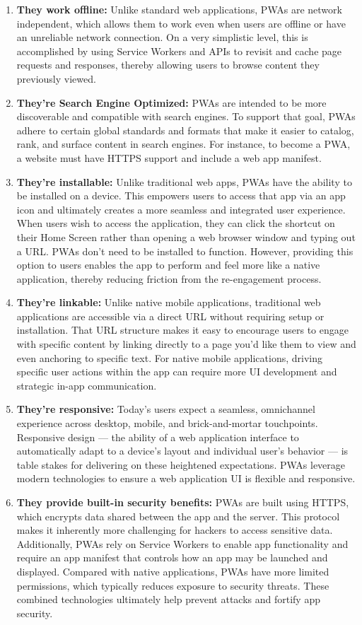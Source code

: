 \documentclass[12pt]{article}
\begin{document}
\begin{enumerate}
    \item \textbf{They work offline:} Unlike standard web applications, PWAs are network independent, which allows them to work even when users are offline or have an unreliable network connection. On a very simplistic level, this is accomplished by using Service Workers and APIs to revisit and cache page requests and responses, thereby allowing users to browse content they previously viewed.
    \item \textbf{They’re Search Engine Optimized:} PWAs are intended to be more discoverable and compatible with search engines. To support that goal, PWAs adhere to certain global standards and formats that make it easier to catalog, rank, and surface content in search engines. For instance, to become a PWA, a website must have HTTPS support and include a web app manifest.
    \item \textbf{They’re installable:} Unlike traditional web apps, PWAs have the ability to be installed on a device. This empowers users to access that app via an app icon and ultimately creates a more seamless and integrated user experience. When users wish to access the application, they can click the shortcut on their Home Screen rather than opening a web browser window and typing out a URL. PWAs don’t need to be installed to function. However, providing this option to users enables the app to perform and feel more like a native application, thereby reducing friction from the re-engagement process.
    \item \textbf{They’re linkable:} Unlike native mobile applications, traditional web applications are accessible via a direct URL without requiring setup or installation. That URL structure makes it easy to encourage users to engage with specific content by linking directly to a page you’d like them to view and even anchoring to specific text. For native mobile applications, driving specific user actions within the app can require more UI development and strategic in-app communication.
    \item \textbf{They're responsive:} Today’s users expect a seamless, omnichannel experience across desktop, mobile, and brick-and-mortar touchpoints. Responsive design — the ability of a web application interface to automatically adapt to a device’s layout and individual user’s behavior — is table stakes for delivering on these heightened expectations. PWAs leverage modern technologies to ensure a web application UI is flexible and responsive.
    \item \textbf{They provide built-in security benefits:} PWAs are built using HTTPS, which encrypts data shared between the app and the server. This protocol makes it inherently more challenging for hackers to access sensitive data. Additionally, PWAs rely on Service Workers to enable app functionality and require an app manifest that controls how an app may be launched and displayed. Compared with native applications, PWAs have more limited permissions, which typically reduces exposure to security threats. These combined technologies ultimately help prevent attacks and fortify app security. 

\end{enumerate}
\end{document}
